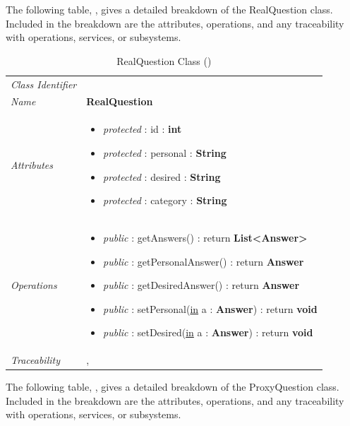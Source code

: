 \documentclass[12pt,letterpaper]{article}
\begin{document}
The following table, , gives a detailed breakdown of the RealQuestion class. Included in the breakdown are the attributes, operations, and any traceability with operations, services, or subsystems.

\begin{table}[H]
    \caption{RealQuestion Class ()} 
	\begin{tabu} to 
		\toprule
		Class Identifier &  \\
		Name & {\bf RealQuestion} \\
		Attributes & 
		\begin{minipage}[t]{\linewidth}
		    \begin{itemize}
		        \item \textit{protected} : id : {\bf int}
		        \item \textit{protected} : personal : {\bf String}
		        \item \textit{protected} : desired : {\bf String}
		        \item \textit{protected} : category : {\bf String}
			\end{itemize}
	    \end{minipage} \\

		Operations &
		\begin{minipage}[t]{\linewidth}
			\begin{itemize}
			    \item {\it public} : getAnswers() : return {\bf List<Answer>}
			    \item {\it public} : getPersonalAnswer() : return {\bf Answer}
			    \item {\it public} : getDesiredAnswer() : return {\bf Answer}
			    \item {\it public} : setPersonal(\underline{in} a : {\bf Answer}) : return {\bf void}
			    \item {\it public} : setDesired(\underline{in} a : {\bf Answer}) : return {\bf void}
	        \end{itemize}
	    \end{minipage} \\
	    	Traceability & , \\
		\toprule
	\end{tabu}
\end{table}

The following table, , gives a detailed breakdown of the ProxyQuestion class. Included in the breakdown are the attributes, operations, and any traceability with operations, services, or subsystems.
\end{document}

